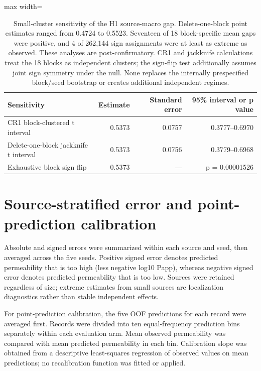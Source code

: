 \documentclass[10pt]{article}
\begin{document}
\begin{table}[htbp]
\centering
\caption{Small-cluster sensitivity of the H1 source-macro gap. Delete-one-block point estimates ranged from 0.4724 to 0.5523. Seventeen of 18 block-specific mean gaps were positive, and 4 of 262,144 sign assignments were at least as extreme as observed. These analyses are post-confirmatory. CR1 and jackknife calculations treat the 18 blocks as independent clusters; the sign-flip test additionally assumes joint sign symmetry under the null. None replaces the internally prespecified block/seed bootstrap or creates additional independent regimes.}
\begin{adjustbox}{max width=\textwidth}
\begin{tabular}{lrrr}
\toprule
\textbf{Sensitivity} & \textbf{Estimate} & \textbf{Standard error} & \textbf{95\% interval or p value} \\
\midrule
CR1 block-clustered t interval & 0.5373 & 0.0757 & 0.3777--0.6970 \\
Delete-one-block jackknife t interval & 0.5373 & 0.0756 & 0.3779--0.6968 \\
Exhaustive block sign flip & 0.5373 & — & p = 0.00001526 \\
\bottomrule
\end{tabular}
\end{adjustbox}
\end{table}

\section*{Source-stratified error and point-prediction calibration}

Absolute and signed errors were summarized within each source and seed, then averaged across the five seeds. Positive signed error denotes predicted permeability that is too high (less negative log10 Papp), whereas negative signed error denotes predicted permeability that is too low. Sources were retained regardless of size; extreme estimates from small sources are localization diagnostics rather than stable independent effects.

For point-prediction calibration, the five OOF predictions for each record were averaged first. Records were divided into ten equal-frequency prediction bins separately within each evaluation arm. Mean observed permeability was compared with mean predicted permeability in each bin. Calibration slope was obtained from a descriptive least-squares regression of observed values on mean predictions; no recalibration function was fitted or applied.
\end{document}
